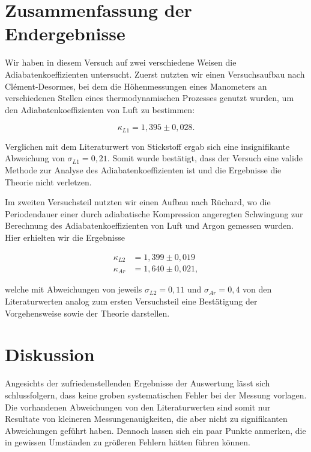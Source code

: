 \documentclass{article}
\begin{document}
\section{Zusammenfassung der Endergebnisse}

Wir haben in diesem Versuch auf zwei verschiedene Weisen die Adiabatenkoeffizienten untersucht. Zuerst nutzten wir einen Versuchsaufbau nach Clément-Desormes, bei dem die Höhenmessungen eines Manometers an verschiedenen Stellen eines thermodynamischen Prozesses genutzt wurden, um den Adiabatenkoeffizienten von Luft zu bestimmen:

\begin{equation}
    \kappa_{L1} = 1,395 \pm 0,028.
\end{equation}

Verglichen mit dem Literaturwert von Stickstoff ergab sich eine insignifikante Abweichung von $\sigma_{L1} = 0,21$. Somit wurde bestätigt, dass der Versuch eine valide Methode zur Analyse des Adiabatenkoeffizienten ist und die Ergebnisse die Theorie nicht verletzen.

Im zweiten Versuchsteil nutzten wir einen Aufbau nach Rüchard, wo die Periodendauer einer durch adiabatische Kompression angeregten Schwingung zur Berechnung des Adiabatenkoeffizienten von Luft und Argon gemessen wurden. Hier erhielten wir die Ergebnisse 

\begin{equation}
    \begin{split}
        \kappa_{L2} &= 1,399 \pm 0,019 \\
        \kappa_{Ar} &= 1,640 \pm 0,021,
    \end{split}
\end{equation}

welche mit Abweichungen von jeweils $\sigma_{L2} = 0,11$ und $\sigma_{Ar} = 0,4$ von den Literaturwerten analog zum ersten Versuchsteil eine Bestätigung der Vorgehensweise sowie der Theorie darstellen.

\newpage
\section{Diskussion}

Angesichts der zufriedenstellenden Ergebnisse der Auswertung lässt sich schlussfolgern, dass keine groben systematischen Fehler bei der Messung vorlagen. Die vorhandenen Abweichungen von den Literaturwerten sind somit nur Resultate von kleineren Messungenauigkeiten, die aber nicht zu signifikanten Abweichungen geführt haben. Dennoch lassen sich ein paar Punkte anmerken, die in gewissen Umständen zu größeren Fehlern hätten führen können.
\end{document}
